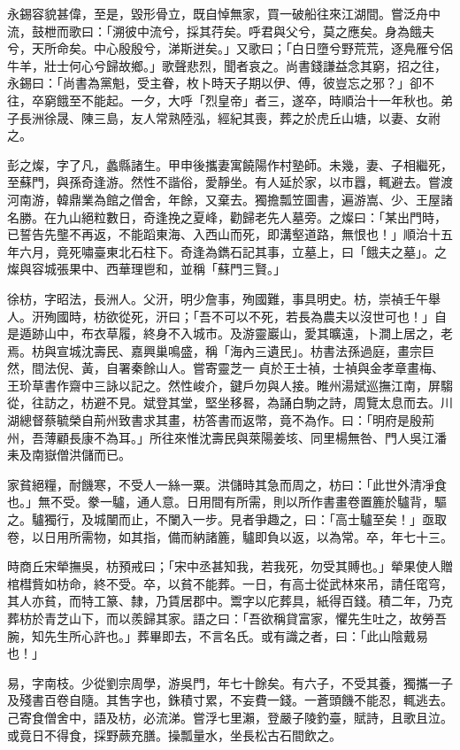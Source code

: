 \begin{pinyinscope}
永錫容貌甚偉，至是，毀形骨立，既自悼無家，買一破船往來江湖間。嘗泛舟中流，鼓枻而歌曰：「溯彼中流兮，採其荇矣。呼君與父兮，莫之應矣。身為餓夫兮，天所命矣。中心殷殷兮，涕斯迸矣。」又歌曰；「白日墮兮野荒荒，逐鳧雁兮侶牛羊，壯士何心兮歸故鄉。」歌聲悲烈，聞者哀之。尚書錢謙益念其窮，招之往，永錫曰：「尚書為黨魁，受主眷，枚卜時天子期以伊、傅，彼豈忘之邪？」卻不往，卒窮餓至不能起。一夕，大呼「烈皇帝」者三，遂卒，時順治十一年秋也。弟子長洲徐晟、陳三島，友人常熟陸泓，經紀其喪，葬之於虎丘山塘，以妻、女祔之。

彭之燦，字了凡，蠡縣諸生。甲申後攜妻寓饒陽作村塾師。未幾，妻、子相繼死，至蘇門，與孫奇逢游。然性不諧俗，愛靜坐。有人延於家，以市囂，輒避去。嘗渡河南游，韓鼎業為館之僧舍，年餘，又棄去。獨擔瓢笠圖書，遍游嵩、少、王屋諸名勝。在九山絕粒數日，奇逢挽之夏峰，勸歸老先人墓旁。之燦曰：「某出門時，已誓告先壟不再返，不能蹈東海、入西山而死，即溝壑道路，無恨也！」順治十五年六月，竟死嘯臺東北石柱下。奇逢為鐫石記其事，立墓上，曰「餓夫之墓」。之燦與容城張果中、西華理鬯和，並稱「蘇門三賢。」

徐枋，字昭法，長洲人。父汧，明少詹事，殉國難，事具明史。枋，崇禎壬午舉人。汧殉國時，枋欲從死，汧曰；「吾不可以不死，若長為農夫以沒世可也！」自是遁跡山中，布衣草履，終身不入城市。及游靈巖山，愛其曠遠，卜澗上居之，老焉。枋與宣城沈壽民、嘉興巢鳴盛，稱「海內三遺民」。枋書法孫過庭，畫宗巨然，間法倪、黃，自署秦餘山人。嘗寄靈芝一貞於王士禎，士禎與金孝章畫梅、王玠草書作齋中三詠以記之。然性峻介，鍵戶勿與人接。睢州湯斌巡撫江南，屏騶從，往訪之，枋避不見。斌登其堂，堅坐移晷，為誦白駒之詩，周覽太息而去。川湖總督蔡毓榮自荊州致書求其畫，枋答書而返幣，竟不為作。曰：「明府是殷荊州，吾薄顧長康不為耳。」所往來惟沈壽民與萊陽姜垓、同里楊無咎、門人吳江潘耒及南嶽僧洪儲而已。

家貧絕糧，耐饑寒，不受人一絲一粟。洪儲時其急而周之，枋曰：「此世外清凈食也。」無不受。豢一驢，通人意。日用間有所需，則以所作書畫卷置簏於驢背，驅之。驢獨行，及城闉而止，不闌入一步。見者爭趣之，曰：「高士驢至矣！」亟取卷，以日用所需物，如其指，備而納諸簏，驢即負以返，以為常。卒，年七十三。

時商丘宋犖撫吳，枋預戒曰；「宋中丞甚知我，若我死，勿受其賻也。」犖果使人贈棺槥貲如枋命，終不受。卒，以貧不能葬。一日，有高士從武林來吊，請任窀穹，其人亦貧，而特工篆、隸，乃賃居郡中。鬻字以庀葬具，紙得百錢。積二年，乃克葬枋於青芝山下，而以羨歸其家。語之曰：「吾欲稱貸富家，懼先生吐之，故勞吾腕，知先生所心許也。」葬畢即去，不言名氏。或有識之者，曰：「此山陰戴易也！」

易，字南枝。少從劉宗周學，游吳門，年七十餘矣。有六子，不受其養，獨攜一子及殘書百卷自隨。其售字也，銖積寸累，不妄費一錢。一蒼頭饑不能忍，輒逃去。己寄食僧舍中，語及枋，必流涕。嘗浮七里瀨，登嚴子陵釣臺，賦詩，且歌且泣。或竟日不得食，採野蕨充膳。操瓢量水，坐長松古石間飲之。


\end{pinyinscope}
